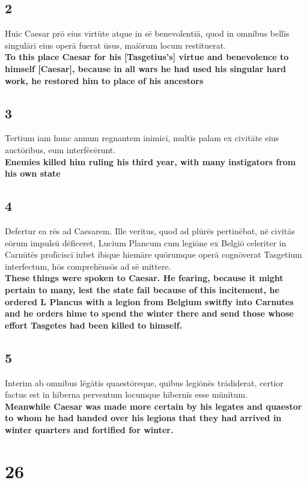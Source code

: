 \documentclass{article}
\begin{document}
\subsection*{2}
Huic Caesar prō eius virtūte atque in sē benevolentiā, quod in omnibus bellīs singulārī eius operā fuerat ūsus, maiōrum locum restituerat.\\
\textbf{To this place Caesar for his [Tasgetius's] virtue and benevolence to himself [Caesar], because in all wars he had used his singular hard work, he restored him to place of his ancestors}

\subsection*{3}
Tertium iam hunc annum regnantem inimicī, multīs palam ex civitāte eius auctōribus, eum interfēcērunt. \\
\textbf{Enemies killed him ruling his third year, with many instigators from his own state}


\subsection*{4}
Defertur ea rēs ad Caesarem. Ille veritus, quod ad plūrēs pertinēbat, nē cīvitās eōrum impulsū dēficeret, Lucium Plancum cum legiōne ex Belgiō celeriter in Carnūtēs profīciscī iubet ibique hiemāre quōrumque operā cognōverat Tasgetium interfectum, hōs comprehēnsōs ad sē mittere.\\
\textbf{These things were spoken to Caesar. He fearing, because it might pertain to many, lest the state fail because of this incitement, he ordered L Plancus with a legion from Belgium switfly into Carnutes and he orders hime to spend the winter there and send those whose effort Tasgetes had been killed to himself.}

\subsection*{5}
Interim ab omnibus lēgātīs quaestōreque, quibus legiōnēs trādiderat, certior factus est in hīberna perventum locumque hībernīs esse mūnītum.\\
\textbf{Meanwhile Caesar was made more certain by his legates and quaestor to whom he had handed over his legions that they had arrived in winter quarters and fortified for winter.}

\section*{26}
\end{document}
